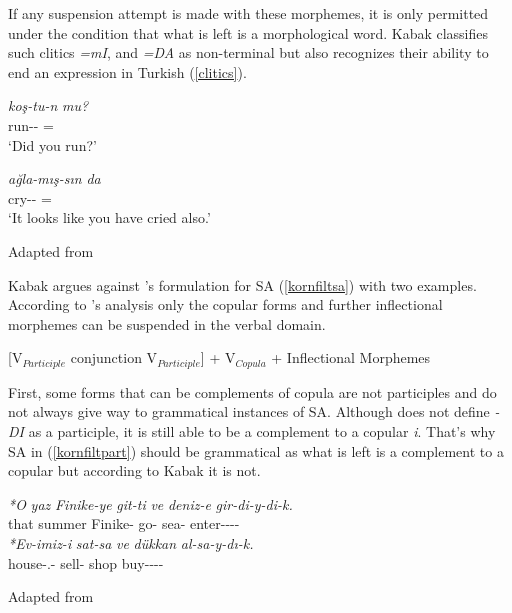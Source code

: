 If any suspension attempt is made with these morphemes, it is only permitted under the condition that what is left is a morphological word. Kabak classifies such clitics \textit{=mI}, and \textit{=DA} as non-terminal but also recognizes their ability to end an expression in Turkish (\ref{clitics}).

\begin{exe}
    \ex \label{clitics}
    \begin{xlist}
        \ex
        \gll
        \textit{koş-tu-n} \textit{mu?} \\ run-{{\Pst}}-{\Second}{\Sg} ={\Q} \\
        \glt `Did you run?'
        
        \ex 
        \gll
        \textit{ağla-mış-sın} \textit{da} \\ cry-{\Evi}-{\Second}{\Sg} ={\Foc} \\ 
        \glt `It looks like you have cried also.'
    \end{xlist}
    \hfill Adapted from \cite{kabak2007turkish}
\end{exe}
Kabak argues against \cite{kornfilt1996some}'s formulation for SA (\ref{kornfiltsa}) with two examples. According to \cite{kornfilt1996some}'s analysis only the copular forms and further inflectional morphemes can be suspended in the verbal domain.
\begin{exe}
    \ex \label{kornfiltsa}
    [V$_{Participle}$ conjunction V$_{Participle}$] + V$_{Copula}$ + Inflectional Morphemes
\end{exe}

First, some forms that can be complements of copula are not participles and do not always give way to grammatical instances of SA. Although \cite{kornfilt1996some} does not define \textit{-DI} as a participle, it is still able to be a complement to a copular \textit{i}. That's why SA in (\ref{kornfiltpart}) should be grammatical as what is left is a complement to a copular but according to Kabak it is not.

\begin{exe}
    \ex \label{kornfiltpart}
    \begin{xlist}
        \ex
        \gll
        \textit{*O} \textit{yaz} \textit{Finike-ye} \textit{git-ti} \textit{ve} \textit{deniz-e} \textit{gir-di-y-di-k.} \\ that summer Finike-{\Dat} go-{{\Pst}} {\And} sea-{\Dat} enter-{{\Pst}}-{\Cop}-{{\Pst}}-{\First}{\Pl} \\
        
        \ex 
        \gll 
        \textit{*Ev-imiz-i} \textit{sat-sa} \textit{ve} \textit{dükkan} \textit{al-sa-y-dı-k.} \\ house-{\Poss}.{\Fpl}-{\Acc} sell-{\Cond} {\And} shop buy-{\Cond}-{\Cop}-{{\Pst}}-{\First}{\Pl} \\
    \end{xlist}
\hfill Adapted from \cite{kabak2007turkish}
\end{exe}

